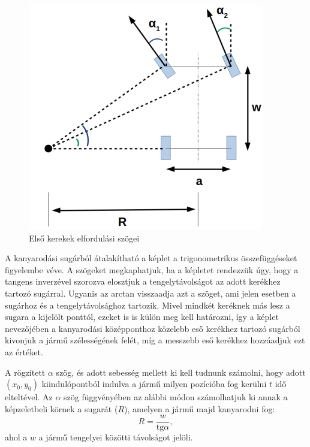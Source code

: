 \begin{figure}[h!]
\centering
\includegraphics[scale=0.5]{images/turning_vehicle.png}
\caption{Első kerekek elfordulási szögei}
\label{fig:turning_vehicle}
\end{figure}
\vspace{5mm}


A kanyarodási sugárból átalakítható a képlet a trigonometrikus összefüggéseket figyelembe véve. A szögeket megkaphatjuk, ha a képletet rendezzük úgy, hogy a tangens inverzével szorozva elosztjuk a tengelytávolságot az adott kerékhez tartozó sugárral. Ugyanis az arctan visszaadja azt a szöget, ami jelen esetben a sugárhoz és a tengelytávolsághoz tartozik. Mivel mindkét keréknek más lesz a sugara a kijelölt ponttól, ezeket is is külön meg kell határozni, így a képlet nevezőjében a kanyarodási középponthoz közelebb eső kerékhez tartozó sugárból kivonjuk a jármű szélességének felét, míg a messzebb eső kerékhez hozzáadjuk ezt az értéket.
\vspace{15mm}



A rögzített $\alpha$ szög, és adott sebesség mellett ki kell tudnunk számolni, hogy adott $(x_0, y_0)$ kiindulópontból indulva a jármű milyen pozícióba fog kerülni $t$ idő elteltével. Az $\alpha$ szög függvényében az alábbi módon számolhatjuk ki annak a képzeletbeli körnek a sugarát ($R$), amelyen a jármű majd kanyarodni fog:
\[
R = \dfrac{w}{\text{tg} \alpha},
\]
ahol a $w$ a jármű tengelyei közötti távolságot jelöli.

